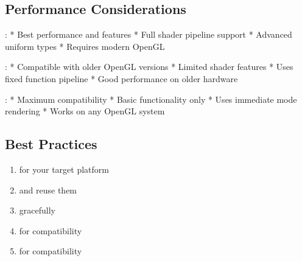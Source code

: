 \documentclass[a4paper,10pt,english,openany,oneside]{sphinxmanual}
\begin{document}
\subsection{Performance Considerations}
\label{\detokenize{api/shaders:performance-considerations}}
\sphinxAtStartPar
{}:
* Best performance and features
* Full shader pipeline support
* Advanced uniform types
* Requires modern OpenGL

\sphinxAtStartPar
{}:
* Compatible with older OpenGL versions
* Limited shader features
* Uses fixed function pipeline
* Good performance on older hardware

\sphinxAtStartPar
{}:
* Maximum compatibility
* Basic functionality only
* Uses immediate mode rendering
* Works on any OpenGL system


\subsection{Best Practices}
\label{\detokenize{api/shaders:best-practices}}\begin{enumerate}
%
\item {} 
\sphinxAtStartPar
{} for your target platform

\item {} 
\sphinxAtStartPar
{} and reuse them

\item {} 
\sphinxAtStartPar
{} gracefully

\item {} 
\sphinxAtStartPar
{} for compatibility

\item {} 
\sphinxAtStartPar
{} for compatibility

\end{enumerate}
\end{document}
